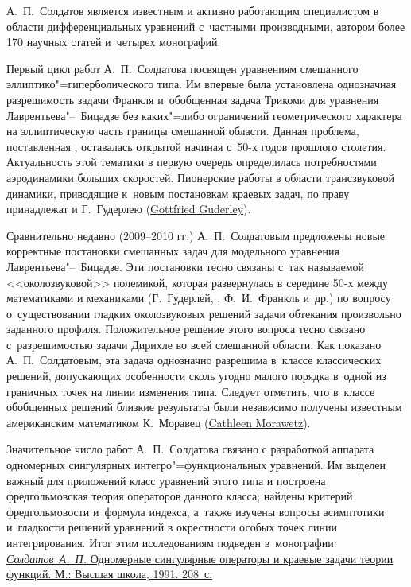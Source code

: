 А.~П.~Солдатов является известным и активно работающим специалистом в области дифференциальных уравнений с~частными производными, автором более 170 научных статей и~четырех монографий.

Первый цикл работ А.~П.~Солдатова посвящен уравнениям смешанного эллиптико"=гиперболического типа. 
Им впервые была установлена однозначная разрешимость задачи Франкля и~обобщенная задача Трикоми для уравнения Лаврентьева"--~Бицадзе без каких"=либо ограничений геометрического характера на эллиптическую часть границы смешанной области. 
Данная проблема, поставленная , оставалась открытой начиная с~50-х годов прошлого столетия. 
Актуальность этой тематики в первую очередь определилась потребностями аэродинамики больших скоростей. 
Пионерские работы в области трансзвуковой динамики, приводящие к~новым постановкам краевых задач, по праву принадлежат  и {Г.~Гудерлею} (\href{https://zbmath.org/authors/?q=ai:guderley.gottfried}{Gottfried Guderley}). 

Сравнительно недавно (2009--2010 гг.) А.~П.~Солдатовым предложены новые корректные постановки смешанных задач для модельного уравнения Лаврентьева"--~Бицадзе. 
Эти постановки тесно связаны с~так называемой <<околозвуковой>> полемикой, которая развернулась в середине 50-х между математиками и механиками (Г.~Гудерлей, , Ф.~И.~Франкль и~др.) по вопросу о~существовании гладких околозвуковых решений задачи обтекания произвольно заданного профиля. 
Положительное решение этого вопроса тесно связано с~разрешимостью задачи Дирихле во всей смешанной области. 
Как показано А.~П.~Солдатовым, эта задача однозначно разрешима в~классе классических решений, допускающих особенности сколь угодно малого порядка в~одной из граничных точек на линии изменения типа. 
Следует отметить, что в~классе обобщенных решений близкие результаты были независимо получены известным американским математиком {К.~Моравец} (\href{https://zbmath.org/authors/?q=ai:synge-morawetz.cathleen}{Cathleen Morawetz}).

Значительное число работ А.~П.~Солдатова связано с разработкой аппарата одномерных сингулярных интегро"=функциональных уравнений. 
Им выделен важный для приложений класс уравнений этого типа и построена фредгольмовская теория операторов данного класса; найдены критерий фредгольмовости и~формула индекса, а~также изучены вопросы асимптотики и~гладкости решений уравнений в окрестности особых точек линии интегрирования. 
Итог этим исследованиям подведен в~монографии:
\href{https://zbmath.org/?q=an:0774.47025}{
{\it Солдатов~А.~П.} Одномерные сингулярные операторы и краевые задачи теории функций. М.: Высшая школа, 1991. 208~с.} 

